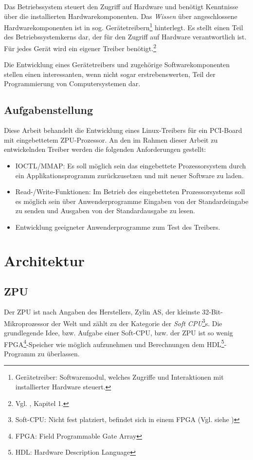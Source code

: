 \documentclass[11pt]{scrartcl}
\begin{document}
Das Betriebssystem steuert den Zugriff auf Hardware und benötigt Kenntnisse über die installierten Hardwarekomponenten. Das \textit{Wissen} über angeschlossene Hardwarekomponenten ist in sog. Gerätetreibern\footnote{Gerätetreiber: Softwaremodul, welches Zugriffe und Interaktionen mit installierter Hardware steuert.} hinterlegt. Es stellt einen Teil des Betriebssystemkerns dar, der für den Zugriff auf Hardware verantwortlich ist. Für jedes Gerät wird ein eigener Treiber benötigt.\footnote{Vgl. \cite{ltp_book}, Kapitel 1.}

Die Entwicklung eines Gerätetreibers und zugehörige Softwarekomponenten stellen einen interessanten, wenn nicht sogar erstrebenswerten, Teil der Programmierung von Computersystemen dar. 

\subsection{Aufgabenstellung}

Diese Arbeit behandelt die Entwicklung eines Linux-Treibers für ein PCI-Board mit eingebettetem ZPU-Prozessor. An den im Rahmen dieser Arbeit zu entwickelnden Treiber werden die folgenden Anforderungen gestellt:

\begin{itemize}
	\item{IOCTL/MMAP: Es soll möglich sein das eingebettete Prozessorsystem durch ein Applikationsprogramm zurückzusetzen und mit neuer Software zu laden.}
	\item{Read-/Write-Funktionen: Im Betrieb des eingebetteten Prozessorsystems soll es möglich sein über Anwenderprogramme Eingaben von der Standardeingabe zu senden und Ausgaben von der Standardausgabe zu lesen.}
	\item{Entwicklung geeigneter Anwenderprogramme zum Test des Treibers.}
\end{itemize}

\pagebreak

\section{Architektur}
 
\subsection{ZPU}

Der ZPU ist nach Angaben des Herstellers, Zylin AS, der kleinste 32-Bit-Mikroprozessor der Welt und zählt zu der Kategorie der \textit{Soft CPU}\footnote{Soft-CPU: Nicht fest platziert, befindet sich in einem FPGA (Vgl. siehe \cite{soft_cpu})}s. Die grundlegende Idee, bzw. Aufgabe einer Soft-CPU, bzw. der ZPU ist so wenig FPGA\footnote{FPGA: Field Programmable Gate Array}-Speicher wie möglich aufzunehmen und Berechnungen dem HDL\footnote{HDL: Hardware Description Language}-Programm zu überlassen.
\end{document}

